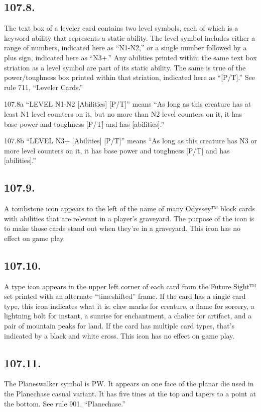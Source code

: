 \subsection*{107.8.}
The text box of a leveler card contains two level symbols, each of which is a keyword ability that represents a static ability. The level symbol includes either a range of numbers, indicated here as “N1-N2,” or a single number followed by a plus sign, indicated here as “N3+.” Any abilities printed within the same text box striation as a level symbol are part of its static ability. The same is true of the power/toughness box printed within that striation, indicated here as “[P/T].” See rule 711, “Leveler Cards.”

107.8a “{LEVEL N1-N2} [Abilities] [P/T]” means “As long as this creature has at least N1 level counters on it, but no more than N2 level counters on it, it has base power and toughness [P/T] and has [abilities].”

107.8b “{LEVEL N3+} [Abilities] [P/T]” means “As long as this creature has N3 or more level counters on it, it has base power and toughness [P/T] and has [abilities].”

\subsection*{107.9.}
A tombstone icon appears to the left of the name of many Odyssey™ block cards with abilities that are relevant in a player’s graveyard. The purpose of the icon is to make those cards stand out when they’re in a graveyard. This icon has no effect on game play.

\subsection*{107.10.}
A type icon appears in the upper left corner of each card from the Future Sight™ set printed with an alternate “timeshifted” frame. If the card has a single card type, this icon indicates what it is: claw marks for creature, a flame for sorcery, a lightning bolt for instant, a sunrise for enchantment, a chalice for artifact, and a pair of mountain peaks for land. If the card has multiple card types, that’s indicated by a black and white cross. This icon has no effect on game play.

\subsection*{107.11.}
The Planeswalker symbol is {PW}. It appears on one face of the planar die used in the Planechase casual variant. It has five tines at the top and tapers to a point at the bottom. See rule 901, “Planechase.”

